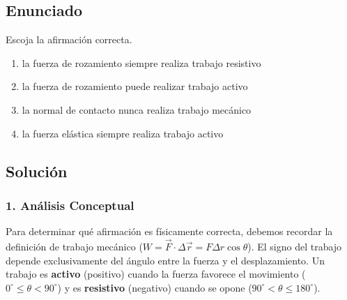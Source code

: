 \documentclass[12pt, a4paper]{article}
\begin{document}
\newpage

\subsection*{Enunciado}
Escoja la afirmación correcta.
\begin{enumerate}[label=\alph*.]
    \item la fuerza de rozamiento siempre realiza trabajo resistivo
    \item la fuerza de rozamiento puede realizar trabajo activo
    \item la normal de contacto nunca realiza trabajo mecánico
    \item la fuerza elástica siempre realiza trabajo activo
\end{enumerate}

\subsection*{Solución}

\subsubsection*{1. Análisis Conceptual}
Para determinar qué afirmación es físicamente correcta, debemos recordar la definición de trabajo mecánico ($W = \vec{F} \cdot \Delta\vec{r} = F \Delta r \cos\theta$). El signo del trabajo depende exclusivamente del ángulo entre la fuerza y el desplazamiento. Un trabajo es \textbf{activo} (positivo) cuando la fuerza favorece el movimiento ($0^\circ \leq \theta < 90^\circ$) y es \textbf{resistivo} (negativo) cuando se opone ($90^\circ < \theta \leq 180^\circ$).
\end{document}
